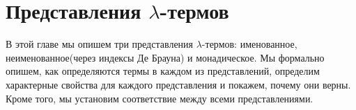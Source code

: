 \section{Представления \texorpdfstring{$\lambda$}{лямбда}-термов}

В этой главе мы опишем три представления $\lambda$-термов: именованное, неименованное(через индексы Де Брауна) и монадическое. Мы формально опишем, как определяются термы в каждом из представлений, определим характерные свойства для каждого представления и покажем, почему они верны. Кроме того, мы установим соответствие между всеми представлениями.






